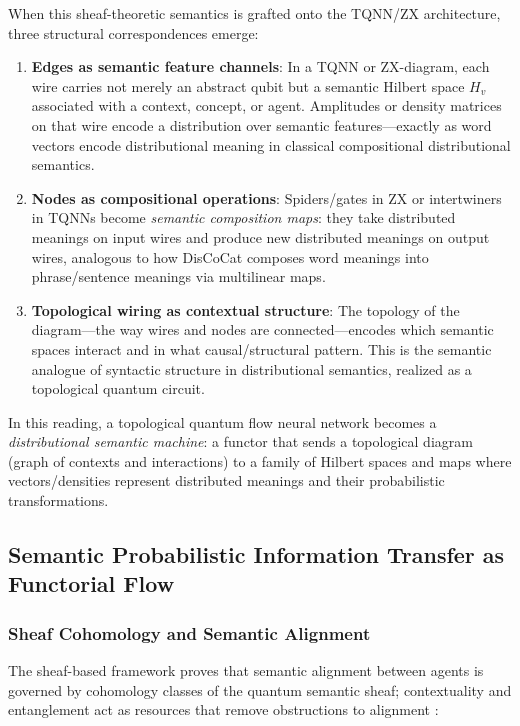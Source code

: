 \documentclass[
]{article}
\numberwithin{equation}{section}
\begin{document}
When this sheaf-theoretic semantics is grafted onto the TQNN/ZX
architecture, three structural correspondences emerge:

\begin{enumerate}
\def\labelenumi{\arabic{enumi}.}
\item
  \textbf{Edges as semantic feature channels}: In a TQNN or ZX-diagram,
  each wire carries not merely an abstract qubit but a semantic Hilbert
  space \(H_v\) associated with a context, concept, or agent. Amplitudes
  or density matrices on that wire encode a distribution over semantic
  features---exactly as word vectors encode distributional meaning in
  classical compositional distributional semantics.
\item
  \textbf{Nodes as compositional operations}: Spiders/gates in ZX or
  intertwiners in TQNNs become \emph{semantic composition maps}: they
  take distributed meanings on input wires and produce new distributed
  meanings on output wires, analogous to how DisCoCat composes word
  meanings into phrase/sentence meanings via multilinear maps.
\item
  \textbf{Topological wiring as contextual structure}: The topology of
  the diagram---the way wires and nodes are connected---encodes which
  semantic spaces interact and in what causal/structural pattern. This
  is the semantic analogue of syntactic structure in distributional
  semantics, realized as a topological quantum circuit.
\end{enumerate}

In this reading, a topological quantum flow neural network becomes a
\emph{distributional semantic machine}: a functor that sends a
topological diagram (graph of contexts and interactions) to a family of
Hilbert spaces and maps where vectors/densities represent distributed
meanings and their probabilistic transformations.

\subsection{Semantic Probabilistic Information Transfer as Functorial
Flow}\label{semantic-probabilistic-information-transfer-as-functorial-flow}

\subsubsection{Sheaf Cohomology and Semantic
Alignment}\label{sheaf-cohomology-and-semantic-alignment}

The sheaf-based framework proves that semantic alignment between agents
is governed by cohomology classes of the quantum semantic sheaf;
contextuality and entanglement act as resources that remove obstructions
to alignment \citep{khatri2025quantum}:
\end{document}
